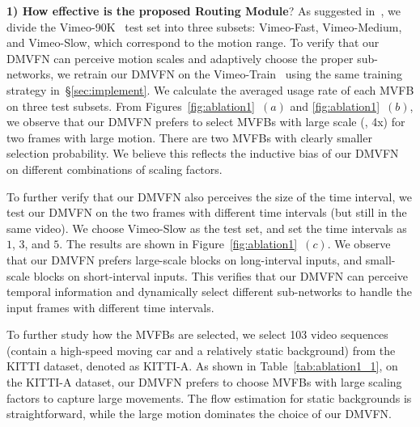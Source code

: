 \documentclass[10pt,twocolumn,letterpaper]{article}
\begin{document}
\noindent
\textbf{1) How effective is the proposed Routing Module}? As suggested in~\cite{xiang2020zooming,TMNet2021}, we divide the Vimeo-90K~\cite{vimeo} test set into three subsets: Vimeo-Fast, Vimeo-Medium, and Vimeo-Slow, which correspond to the motion range. To verify that our DMVFN can perceive motion scales and adaptively choose the proper sub-networks, we retrain our DMVFN on the Vimeo-Train~\cite{vimeo} using the same training strategy in~\S\ref{sec:implement}. We calculate the averaged usage rate of each MVFB on three test subsets. From Figures~\ref{fig:ablation1}~$(a)$ and \ref{fig:ablation1}~$(b)$, we observe that our DMVFN prefers to select MVFBs with large scale (\eg, 4x) for two frames with large motion. There are two MVFBs with clearly smaller selection probability. We believe this reflects the inductive bias of our DMVFN on different combinations of scaling factors.

To further verify that our DMVFN also perceives the size of the time interval, we test our DMVFN on the two frames with different time intervals (but still in the same video). We choose Vimeo-Slow as the test set, and set the time intervals as $1$, $3$, and $5$. The results are shown in Figure~\ref{fig:ablation1}~$(c)$. We observe that our DMVFN prefers large-scale blocks on long-interval inputs, and small-scale blocks on short-interval inputs. This verifies that our DMVFN can perceive temporal information and dynamically select different sub-networks to handle the input frames with different time intervals.

To further study how the MVFBs are selected, we select 103 video sequences (contain a high-speed moving car and a relatively static background) from the KITTI dataset, denoted as KITTI-A. As shown in Table~\ref{tab:ablation1_1}, on the KITTI-A dataset, our DMVFN prefers to choose MVFBs with large scaling factors to capture large movements. The flow estimation for static backgrounds is straightforward, while the large motion dominates the choice of our DMVFN.

\begin{table}[!htb]
\vspace{-2mm}
  \centering
  \caption{\textbf{Average usage rate ($10^{-2}$) of MVFBs in our DMVFN.}}
  \label{tab:ablation1_1}
\end{table}
\end{document}
